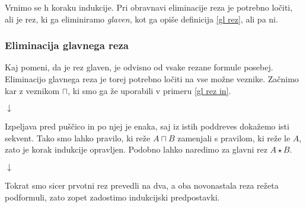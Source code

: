 Vrnimo se h koraku indukcije. Pri obravnavi eliminacije reza je potrebno ločiti, ali je rez, ki ga eliminiramo \emph{glaven}, kot ga opiše definicija \ref{gl rez}, ali pa ni.

\subsubsection{Eliminacija glavnega reza}

Kaj pomeni, da je rez glaven, je odvisno od vsake rezane formule posebej. Eliminacijo glavnega reza je torej potrebno ločiti na vse možne veznike. Začnimo kar z veznikom $\sqcap$, ki smo ga že uporabili v primeru \ref{gl rez in}.
\begin{prooftree}


\end{prooftree}
\begin{center}
    $\downarrow$
\end{center}
\begin{prooftree}
\end{prooftree}
Izpeljava pred puščico in po njej je enaka, saj iz istih poddreves dokažemo isti sekvent. Tako smo lahko pravilo, ki reže $A \sqcap B$ zamenjali s pravilom, ki reže le $A$, zato je korak indukcije opravljen. Podobno lahko naredimo za glavni rez $A \star B$.

\begin{prooftree}


\end{prooftree}
\begin{center}
    $\downarrow$
\end{center}
\begin{prooftree}


\end{prooftree}
Tokrat smo sicer prvotni rez prevedli na dva, a oba novonastala reza režeta podformuli, zato zopet zadostimo indukcijski predpostavki.

